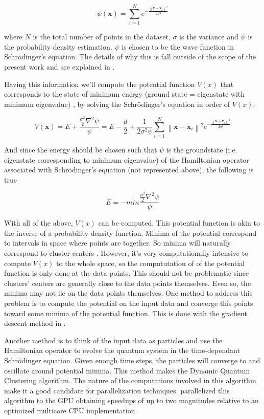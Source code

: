 $$ \psi (\mathbf{x}) = \sum ^N _{i=1} e^{- \frac{\left \| \mathbf{x}-\mathbf{x}_i \right \| ^2}{2 \sigma ^2}} $$

where $N$ is the total number of points in the dataset, $\sigma$ is the variance and $\psi$ is the probability density estimation. $\psi$ is chosen to be the wave function in Schrödinger's equation.
The details of why this is fall outside of the scope of the present work and are explained in \cite{Weinstein2009,Horn2001a,Horn2001b}.

Having this information we'll compute the potential function $V(x)$ that corresponds to the state of minimum energy (ground state = eigenstate with minimum eigenvalue) \cite{Horn2001a}, by solving the Schrödinger's equation in order of $V(x)$:      

$$
V(\mathbf{x}) = E + \frac {\frac{\sigma^2}{2}\nabla^2 \psi }{\psi} 
= E - \frac{d}{2} + \frac {1}{2 \sigma^2 \psi} \sum ^N _{i=1} \left \| \mathbf{x}-\mathbf{x}_i \right \| ^2 e^{- \frac{\left \| \mathbf{x}-\mathbf{x}_i \right \| ^2}{2 \sigma ^2}}
$$

And since the energy should be chosen such that $\psi$ is the groundstate (i.e. eigenstate corresponding to minimum eigenvalue) of the Hamiltonian operator associated with Schrödinger's equation (not represented above), the following is true

$$
E = - min \frac {\frac{\sigma^2}{2}\nabla^2 \psi }{\psi}
$$

With all of the above, $V(x)$ can be computed.
This potential function is akin to the inverse of a probability density function.
Minima of the potential correspond to intervals in space where points are together.
So minima will naturally correspond to cluster centers \cite{Horn2001a}.
However, it's very computationally intensive to compute $V(x)$ to the whole space, so the compututation of of the potential function is only done at the data points.
This should not be problematic since clusters' centers are generally close to the data points themselves. 
Even so, the minima may not lie on the data points themselves.
One method to address this problem is to compute the potential on the input data and converge this points toward some minima of the potential function.
This is done with the gradient descent method in \cite{Horn2001a}. 

Another method \cite{Weinstein2009} is to think of the input data as particles and use the Hamiltonian operator to evolve the quantum system in the time-dependant Schrödinger equation.
Given enough time steps, the particles will converge to and oscillate around potential minima.
This method makes the Dynamic Quantum Clustering algorithm.
The nature of the computations involved in this algorithm make it a good candidate for parallelization techniques.
\cite{Wittek2013} parallelized this algorithm to the GPU obtaining speedups of up to two magnitudes relative to an optimized multicore CPU implementation. %

